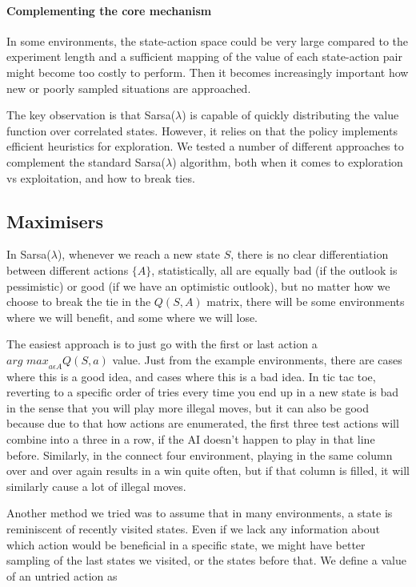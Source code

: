 \paragraph{Complementing the core mechanism}
In some environments, the state-action space could be very large compared to the
experiment length and a sufficient mapping of the value of each state-action
pair might become too costly to perform. Then it becomes increasingly important
how new or poorly sampled situations are approached.

The key observation is that Sarsa($\lambda$) is capable of quickly distributing
the value function over correlated states. However, it relies on that the policy
implements efficient heuristics for exploration. We tested a number of different
approaches to complement the standard Sarsa($\lambda$) algorithm, both when it
comes to exploration vs exploitation, and how to break ties. 

\subsection{Maximisers}
In Sarsa($\lambda$), whenever we reach a new state $S$, there is no clear
differentiation between different actions $\{A\}$, statistically, all are
equally bad (if the outlook is pessimistic) or good (if we have an optimistic
outlook), but no matter how we choose to break the tie in the $Q(S,A)$ matrix,
there will be some environments where we will benefit, and some where we will
lose.

The easiest approach is to just go with the first or last action a $\textit{arg
    max}_{a\epsilon A} Q(S,a)$ value. Just from the example environments, there
are cases where this is a good idea, and cases where this is a bad idea. In tic
tac toe, reverting to a specific order of tries every time you end up in a new
state is bad in the sense that you will play more illegal moves, but it can also
be good because due to that how actions are enumerated, the first three test
actions will combine into a three in a row, if the AI doesn't happen to play in
that line before. Similarly, in the connect four environment, playing in the
same column over and over again results in a win quite often, but if that column
is filled, it will similarly cause a lot of illegal moves.

Another method we tried was to assume that in many environments, a state is
reminiscent of recently visited states. Even if we lack any information about
which action would be beneficial in a specific state, we might have better
sampling of the last states we visited, or the states before that. We define a value of an untried action as

